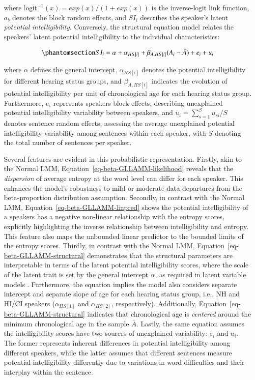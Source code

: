 \documentclass[
  authoryear,
  preprint,
  1p]{elsarticle}
\begin{document}
where \(\text{logit}^{-1}(x) = exp(x) / (1+exp(x))\) is the
inverse-logit link function, \(a_{b}\) denotes the block random effects,
and \(SI_{i}\) describes the speaker's latent \emph{potential
intelligibility}. Conversely, the structural equation model relates the
speakers' latent potential intelligibility to the individual
characteristics:

\begin{equation}\phantomsection\label{eq-beta-GLLAMM-structural}{
SI_{i} = \alpha + \alpha_{HS[i]} + \beta_{A, HS[i]} (A_{i} - \bar{A}) + e_{i} + u_{i}
}\end{equation}

where \(\alpha\) defines the general intercept, \(\alpha_{HS[i]}\)
denotes the potential intelligibility for different hearing status
groups, and \(\beta_{A,HS[i]}\) indicates the evolution of potential
intelligibility per unit of chronological age for each hearing status
group. Furthermore, \(e_{i}\) represents speakers block effects,
describing unexplained potential intelligibility variability between
speakers, and \(u_{i} = \sum_{s=1}^{S} u_{si}/S\) denotes sentence
random effects, assessing the average unexplained potential
intelligibility variability among sentences within each speaker, with
\(S\) denoting the total number of sentences per speaker.

Several features are evident in this probabilistic representation.
Firstly, akin to the Normal LMM,
Equation~\ref{eq-beta-GLLAMM-likelihood} reveals that the
\emph{dispersion} of average entropy at the word level can differ for
each speaker. This enhances the model's robustness to mild or moderate
data departures from the beta-proportion distribution assumption.
Secondly, in contrast with the Normal LMM,
Equation~\ref{eq-beta-GLLAMM-linpred} shows the potential
intelligibility of a speakers has a negative non-linear relationship
with the entropy scores, explicitly highlighting the inverse
relationship between intelligibility and entropy. This feature also maps
the unbounded linear predictor to the bounded limits of the entropy
scores. Thirdly, in contrast with the Normal LMM,
Equation~\ref{eq-beta-GLLAMM-structural} demonstrates that the
structural parameters are interpretable in terms of the latent potential
intelligibility scores, where the scale of the latent trait is set by
the general intercept \(\alpha\), as required in latent variable models
\citep{Depaoli_2021}. Furthermore, the equation implies the model also
considers separate intercept and separate slope of age for each hearing
status group, i.e., NH and HI/CI speakers (\(\alpha_{HS[1]}\) and
\(\alpha_{HS[2]}\), respectively). Additionally,
Equation~\ref{eq-beta-GLLAMM-structural} indicates that chronological
age is \emph{centered} around the minimum chronological age in the
sample \(\bar{A}\). Lastly, the same equation assumes the
intelligibility scores have two sources of unexplained variability:
\(e_{i}\) and \(u_{i}\). The former represents inherent differences in
potential intelligibility among different speakers, while the latter
assumes that different sentences measure potential intelligibility
differently due to variations in word difficulties and their interplay
within the sentence.
\end{document}
